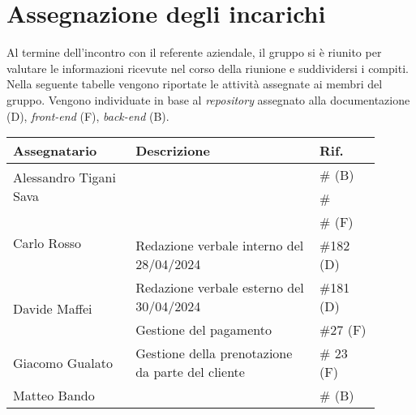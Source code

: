 \section{Assegnazione degli incarichi}
Al termine dell'incontro con il referente aziendale, il gruppo si è riunito per valutare le informazioni ricevute nel corso della riunione e suddividersi i compiti.\\
Nella seguente tabelle vengono riportate le attività assegnate ai membri del gruppo.
Vengono individuate in base al \textit{repository} assegnato alla documentazione (D), \textit{front-end} (F), \textit{back-end} (B).

\begin{center}
	{
		\renewcommand{\arraystretch}{1.5}
		\begin{tabular}{p{0.30\linewidth}|p{0.45\linewidth}|p{0.15\linewidth}}
			\textbf{Assegnatario}          			& \textbf{Descrizione}					& \textbf{Rif.} \\
			\hline
			\multirow{2}{*}{Alessandro Tigani Sava}	&  									&\#  (B)	\\
			\cline{2-3}
													& 	& \#	\\
			\hline
			\multirow{2}{*}{Carlo Rosso}   			& 	&\#  (F)	\\
			\cline{2-3}
			                               			& Redazione verbale interno del 28/04/2024		& \#182	(D)	\\
			\hline
			\multirow{2}{*}{Davide Maffei}			& Redazione verbale esterno del 30/04/2024	& \#181  (D)	\\
			\cline{2-3}
													& Gestione del pagamento	& \#27 (F) 	\\
			\hline
			Giacomo Gualato							& Gestione della prenotazione da parte del cliente	& \# 23 (F)	\\
			\hline
			Matteo Bando  							& 	& \# (B)	\\
			\hline
		\end{tabular}
	}
\end{center}
